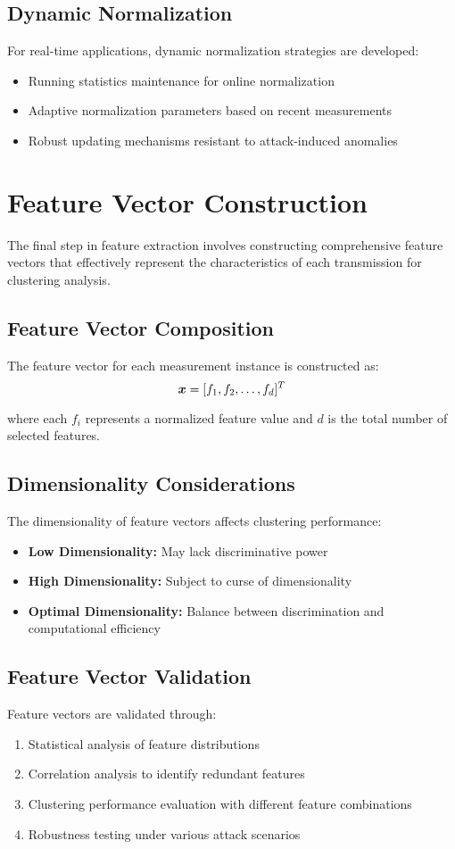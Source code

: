 \subsection{Dynamic Normalization}
For real-time applications, dynamic normalization strategies are developed:
\begin{itemize}
\item Running statistics maintenance for online normalization
\item Adaptive normalization parameters based on recent measurements
\item Robust updating mechanisms resistant to attack-induced anomalies
\end{itemize}

\section{Feature Vector Construction}
The final step in feature extraction involves constructing comprehensive feature vectors that effectively represent the characteristics of each transmission for clustering analysis.

\subsection{Feature Vector Composition}
The feature vector for each measurement instance is constructed as:
\begin{equation}
\boldsymbol{x} = [f_1, f_2, \ldots, f_d]^T
\end{equation}

where each $f_i$ represents a normalized feature value and $d$ is the total number of selected features.

\subsection{Dimensionality Considerations}
The dimensionality of feature vectors affects clustering performance:
\begin{itemize}
\item \textbf{Low Dimensionality:} May lack discriminative power
\item \textbf{High Dimensionality:} Subject to curse of dimensionality
\item \textbf{Optimal Dimensionality:} Balance between discrimination and computational efficiency
\end{itemize}

\subsection{Feature Vector Validation}
Feature vectors are validated through:
\begin{enumerate}
\item Statistical analysis of feature distributions
\item Correlation analysis to identify redundant features
\item Clustering performance evaluation with different feature combinations
\item Robustness testing under various attack scenarios
\end{enumerate}

